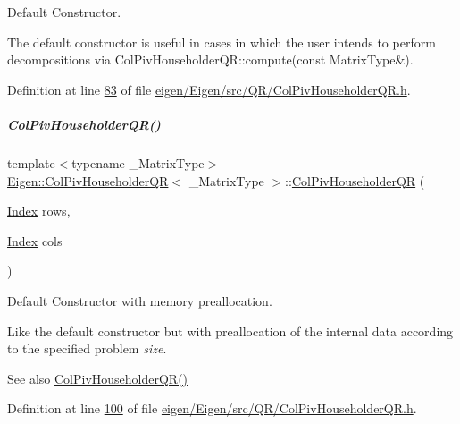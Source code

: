 Default Constructor. 

The default constructor is useful in cases in which the user intends to perform decompositions via Col\+Piv\+Householder\+Q\+R\+::compute(const Matrix\+Type\&). 

Definition at line \hyperlink{eigen_2_eigen_2src_2_q_r_2_col_piv_householder_q_r_8h_source_l00083}{83} of file \hyperlink{eigen_2_eigen_2src_2_q_r_2_col_piv_householder_q_r_8h_source}{eigen/\+Eigen/src/\+Q\+R/\+Col\+Piv\+Householder\+Q\+R.\+h}.

\mbox{\label{group___q_r___module_a5965d4fdebc04b2df71d67ff0b2d0c2c}} 
\subparagraph{\texorpdfstring{Col\+Piv\+Householder\+Q\+R()}{ColPivHouseholderQR()}\hspace{0.1cm}{\footnotesize\ttfamily [2/8]}}
{\footnotesize\ttfamily template$<$typename \+\_\+\+Matrix\+Type$>$ \\
\hyperlink{group___q_r___module_class_eigen_1_1_col_piv_householder_q_r}{Eigen\+::\+Col\+Piv\+Householder\+QR}$<$ \+\_\+\+Matrix\+Type $>$\+::\hyperlink{group___q_r___module_class_eigen_1_1_col_piv_householder_q_r}{Col\+Piv\+Householder\+QR} (\begin{DoxyParamCaption}\item[{\hyperlink{namespace_eigen_a62e77e0933482dafde8fe197d9a2cfde}{Index}}]{rows,  }\item[{\hyperlink{namespace_eigen_a62e77e0933482dafde8fe197d9a2cfde}{Index}}]{cols }\end{DoxyParamCaption})\hspace{0.3cm}{\ttfamily [inline]}}



Default Constructor with memory preallocation. 

Like the default constructor but with preallocation of the internal data according to the specified problem {\itshape size}. \begin{DoxySeeAlso}{See also}
\hyperlink{group___q_r___module_a9d8a92c2a2f0debe5454812372237ed4}{Col\+Piv\+Householder\+Q\+R()} 
\end{DoxySeeAlso}


Definition at line \hyperlink{eigen_2_eigen_2src_2_q_r_2_col_piv_householder_q_r_8h_source_l00100}{100} of file \hyperlink{eigen_2_eigen_2src_2_q_r_2_col_piv_householder_q_r_8h_source}{eigen/\+Eigen/src/\+Q\+R/\+Col\+Piv\+Householder\+Q\+R.\+h}.

